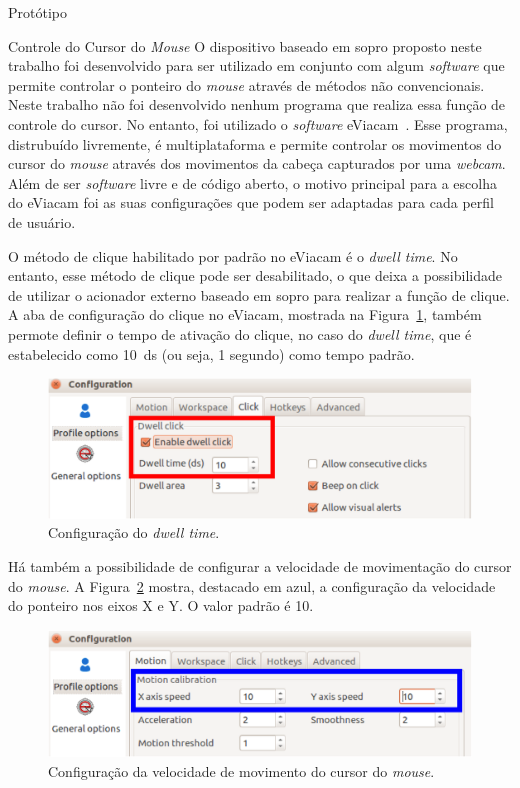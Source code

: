 \begin{chapter}{Protótipo}
\begin{section}{Controle do Cursor do \textit{Mouse}}
O dispositivo baseado em sopro proposto neste trabalho foi desenvolvido para ser
utilizado em conjunto com algum \textit{software} que permite controlar o
ponteiro do \textit{mouse} através de métodos não convencionais. Neste trabalho
não foi desenvolvido nenhum programa que realiza essa função de controle do
cursor. No entanto, foi utilizado o \textit{software} eViacam~\cite{eviacam}.
Esse programa, distrubuído livremente, é multiplataforma e permite controlar os
movimentos do cursor do \textit{mouse} através dos movimentos da cabeça
capturados por uma \textit{webcam}. Além de ser \textit{software} livre e de
código aberto, o motivo principal para a escolha do eViacam foi as suas
configurações que podem ser adaptadas para cada perfil de usuário.

O método de clique habilitado por padrão no eViacam é o \textit{dwell time}. No
entanto, esse método de clique pode ser desabilitado, o que deixa a
possibilidade de utilizar o acionador externo baseado em sopro para realizar a
função de clique. A aba de configuração do clique no eViacam, mostrada na
Figura~\ref{fig:click}, também permote definir o tempo de ativação do clique, no
caso do \textit{dwell time}, que é estabelecido como 10~ds (ou seja, 1 segundo)
como tempo padrão. 

\begin{figure}[!h]
	\centering
	\begin{minipage}[c]{\textwidth}
	\centering
	\includegraphics[width=0.7\linewidth]{fig/eviacamclick}
	\caption{Configuração do \textit{dwell time}.}
	\label{fig:click}
	\end{minipage}
\end{figure}
 
Há também a possibilidade de configurar a velocidade de movimentação do cursor
do \textit{mouse}. A Figura~\ref{fig:mouse} mostra, destacado em azul, a
configuração da velocidade do ponteiro nos eixos X e Y. O valor padrão é 10.

\begin{figure}[!h]
	\centering
	\begin{minipage}[c]{\textwidth}
	\centering
	\includegraphics[width=0.7\linewidth]{fig/EviacamConfiguration}
	\caption{Configuração da velocidade de movimento do cursor do \textit{mouse}.}
	\label{fig:mouse}
	\end{minipage}
\end{figure}

\end{section}

\end{chapter}
